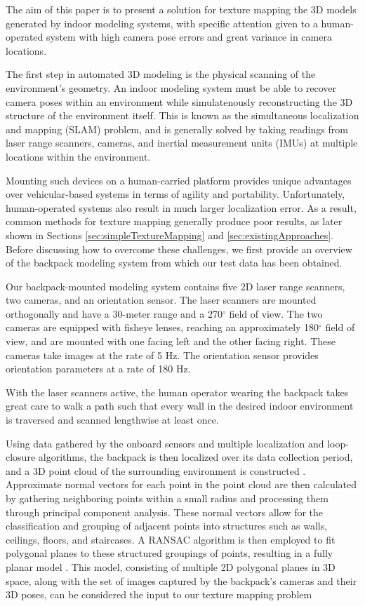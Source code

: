 \documentclass[10pt,twocolumn,letterpaper]{article}
\begin{document}
The aim of this paper is to present a solution for texture mapping the
3D models generated by indoor modeling systems, with specific
attention given to a human-operated system with high camera pose
errors and great variance in camera locations.

The first step in automated 3D modeling is the physical scanning of
the environment's geometry. An indoor modeling system must be able to
recover camera poses within an environment while simulatenously
reconstructing the 3D structure of the environment itself. This is
known as the simultaneous localization and mapping (SLAM) problem, and
is generally solved by taking readings from laser range scanners,
cameras, and inertial measurement units (IMUs) at multiple locations
within the environment.

Mounting such devices on a human-carried platform provides unique
advantages over vehicular-based systems in terms of agility and
portability. Unfortunately, human-operated systems also result in much
larger localization error. As a result, common methods for texture
mapping generally produce poor results, as later shown in Sections
\ref{sec:simpleTextureMapping} and
\ref{sec:existingApproaches}. Before discussing how to overcome these
challenges, we first provide an overview of the backpack modeling
system from which our test data has been obtained.

Our backpack-mounted modeling system contains five 2D laser range
scanners, two cameras, and an orientation sensor. The laser scanners
are mounted orthogonally and have a 30-meter range and a 270$^{\circ}$
field of view. The two cameras are equipped with fisheye lenses,
reaching an approximately 180$^{\circ}$ field of view, and are mounted
with one facing left and the other facing right. These cameras take
images at the rate of 5 Hz. The orientation sensor provides
orientation parameters at a rate of 180 Hz.

With the laser scanners active, the human operator wearing the
backpack takes great care to walk a path such that every wall in the
desired indoor environment is traversed and scanned lengthwise at
least once.

Using data gathered by the onboard sensors and multiple localization
and loop-closure algorithms, the backpack is then localized over its
data collection period, and a 3D point cloud of the surrounding
environment is constructed \cite{chen2010indoor, kua2012loopclosure,
  liu2010indoor}. Approximate normal vectors for each point in the
point cloud are then calculated by gathering neighboring points within
a small radius and processing them through principal component
analysis. These normal vectors allow for the classification and
grouping of adjacent points into structures such as walls, ceilings,
floors, and staircases. A RANSAC algorithm is then employed to fit
polygonal planes to these structured groupings of points, resulting in
a fully planar model \cite{sanchez2012point}. This model, consisting
of multiple 2D polygonal planes in 3D space, along with the set of
images captured by the backpack's cameras and their 3D poses, can be
considered the input to our texture mapping problem
\end{document}
